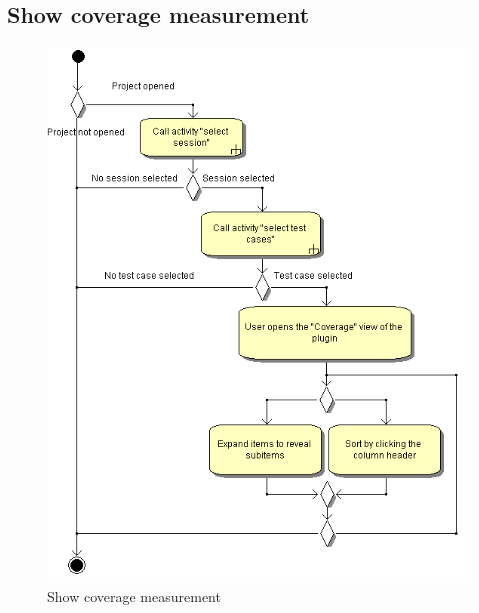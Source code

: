 \subsection{Show coverage measurement}
\begin{figure}[htb]
 \centering
 \includegraphics[height=0.7\textheight]{images/Activities/show_coverage_measurement.png}
 \caption{Show coverage measurement}
 \label{ac_fg:show coverage}
\end{figure}

\clearpage
